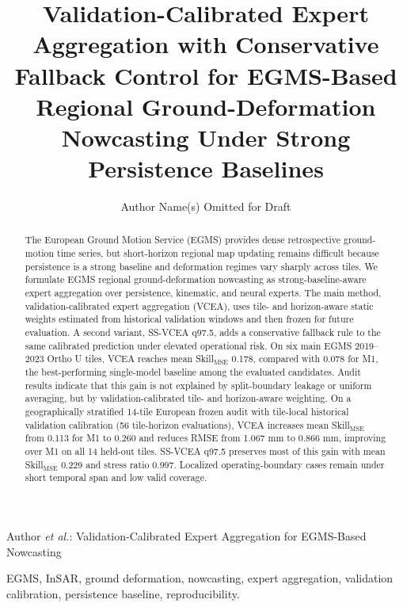 \documentclass[lettersize,journal]{IEEEtran}
\newcommand{\skillmse}{Skill$_{\mathrm{MSE}}$}
\newcommand{\egms}{EGMS 2019--2023 Ortho U}
\begin{document}
\title{Validation-Calibrated Expert Aggregation with Conservative Fallback Control for EGMS-Based Regional Ground-Deformation Nowcasting Under Strong Persistence Baselines}

\author{Author Name(s) Omitted for Draft}

%
{Author \MakeLowercase{\textit{et al.}}: Validation-Calibrated Expert Aggregation for EGMS-Based Nowcasting}

\maketitle

\begin{abstract}
The European Ground Motion Service (EGMS) provides dense retrospective ground-motion time series, but short-horizon regional map updating remains difficult because persistence is a strong baseline and deformation regimes vary sharply across tiles. We formulate EGMS regional ground-deformation nowcasting as strong-baseline-aware expert aggregation over persistence, kinematic, and neural experts. The main method, validation-calibrated expert aggregation (VCEA), uses tile- and horizon-aware static weights estimated from historical validation windows and then frozen for future evaluation. A second variant, SS-VCEA q97.5, adds a conservative fallback rule to the same calibrated prediction under elevated operational risk. On six main \egms{} tiles, VCEA reaches mean \skillmse{} 0.178, compared with 0.078 for M1, the best-performing single-model baseline among the evaluated candidates. Audit results indicate that this gain is not explained by split-boundary leakage or uniform averaging, but by validation-calibrated tile- and horizon-aware weighting. On a geographically stratified 14-tile European frozen audit with tile-local historical validation calibration (56 tile-horizon evaluations), VCEA increases mean \skillmse{} from 0.113 for M1 to 0.260 and reduces RMSE from 1.067 mm to 0.866 mm, improving over M1 on all 14 held-out tiles. SS-VCEA q97.5 preserves most of this gain with mean \skillmse{} 0.229 and stress ratio 0.997. Localized operating-boundary cases remain under short temporal span and low valid coverage.
\end{abstract}

\begin{IEEEkeywords}
EGMS, InSAR, ground deformation, nowcasting, expert aggregation, validation calibration, persistence baseline, reproducibility.
\end{IEEEkeywords}
\end{document}
